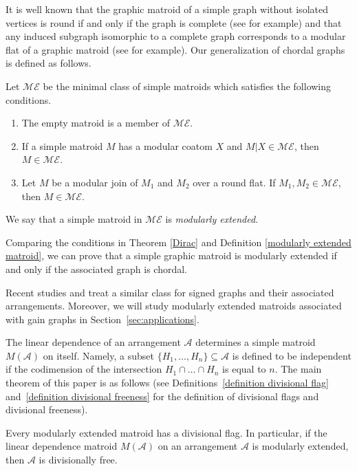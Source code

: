 It is well known that the graphic matroid of a simple graph without isolated vertices is round if and only if the graph is complete (see \cite[Theorem~4.2]{borissova2016regular-etpad} for example) and that any induced subgraph isomorphic to a complete graph corresponds to a modular flat of a graphic matroid (see \cite[Proposition~6.9.11 and below]{oxley2011matroid} for example).
Our generalization of chordal graphs is defined as follows.
\begin{Definition}\label{modularly extended matroid}
Let $ \mathcal{ME} $ be the minimal class of simple matroids which satisfies the following conditions.
\begin{enumerate}[$(i)$]\itemsep=0pt
\item The empty matroid is a member of $ \mathcal{ME} $.
\item If a simple matroid $ M $ has a modular coatom $ X $ and $ M|X \in \mathcal{ME} $, then $ M \in \mathcal{ME} $.
\item Let $ M $ be a modular join of $ M_{1} $ and $ M_{2} $ over a round flat.
If $ M_{1}, M_{2} \in \mathcal{ME} $, then $ M \in \mathcal{ME} $.
\end{enumerate}
We say that a simple matroid in $ \mathcal{ME} $ is \textit{modularly extended}.
\end{Definition}

Comparing the conditions in Theorem \ref{Dirac} and Definition \ref{modularly extended matroid}, we can prove that a simple graphic matroid is modularly extended if and only if the associated graph is chordal.

Recent studies \cite{suyama2019signed-dm} and \cite{torielli2020freeness-a} treat a similar class for signed graphs and their associated arrangements.
Moreover, we will study modularly extended matroids associated with gain graphs in Section~\ref{sec:applications}.


The linear dependence of an arrangement $ \mathcal{A} $ determines a simple matroid $ M(\mathcal{A}) $ on itself.
Namely, a subset $ \{H_{1}, \dots, H_{n}\} \subseteq \mathcal{A} $ is defined to be independent if the codimension of the intersection $ H_{1} \cap \dots \cap H_{n} $ is equal to $ n $.
The main theorem of this paper is as follows (see Definitions~\ref{definition divisional flag} and~\ref{definition divisional freeness} for the definition of divisional flags and divisional freeness).
\begin{Theorem}\label{main divisionally free}
Every modularly extended matroid has a divisional flag. In particular, if the linear dependence matroid $ M(\mathcal{A}) $ on an arrangement $ \mathcal{A} $ is modularly extended, then $ \mathcal{A} $ is divisionally free.
\end{Theorem}

